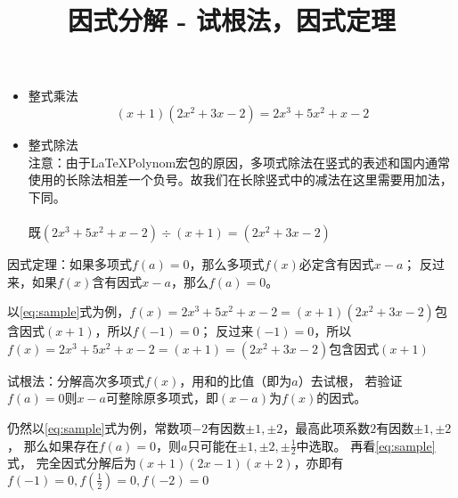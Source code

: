 \documentclass[windows,csize4]{BHCexam}
\title{因式分解 - 试根法，因式定理}
\begin{document}
\maketitle

\begin{groups}
    \begin{itemize}
        \item 整式乘法
              \begin{equation}
                \label{eq:sample}
                  (x+1)(2x^2+3x-2) = 2x^3+5x^2+x-2
              \end{equation}
        \item 整式除法 \\
              注意：由于\LaTeX \quad Polynom宏包的原因，多项式除法在竖式的表述和国内通常使用的长除法相差一个负号。故我们在长除竖式中的减法在这里需要用加法，下同。\\
               \\
              既$(2x^3+5x^2+x-2)\div (x+1)=(2x^2+3x-2)$
    \end{itemize}

    \fbox
    {
        \parbox{\textwidth}
        {
            因式定理：如果多项式$f(a)=0$，那么多项式$f(x)$必定含有因式$x-a$；
            反过来，如果$f(x)$含有因式$x-a$，那么$f(a)=0$。
        }
    }
    以\ref{eq:sample}式为例，$f(x)=2x^3+5x^2+x-2=(x+1)(2x^2+3x-2)$包含因式$(x+1)$，所以$f(-1)=0$；
    反过来$(-1)=0$，所以$f(x)=2x^3+5x^2+x-2=(x+1)=(2x^2+3x-2)$包含因式$(x+1)$

    \fbox
    {
        \parbox{\textwidth}
        {
            试根法：分解高次多项式$f(x)$，用和的比值（即为$a$）去试根，
            若验证$f(a)=0$则$x-a$可整除原多项式，即$(x-a)$为$f(x)$的因式。
        }
    }
    仍然以\ref{eq:sample}式为例，常数项$-2$有因数$\pm 1,\pm 2$，最高此项系数$2$有因数$\pm 1,\pm 2$，
    那么如果存在$f(a)=0$，则$a$只可能在$\pm 1, \pm 2, \pm\frac{1}{2}$中选取。
    再看\ref{eq:sample}式， 完全因式分解后为$(x+1)(2x-1)(x+2)$，亦即有$f(-1)=0,f(\frac{1}{2})=0,f(-2)=0$



\end{groups}
\end{document}
